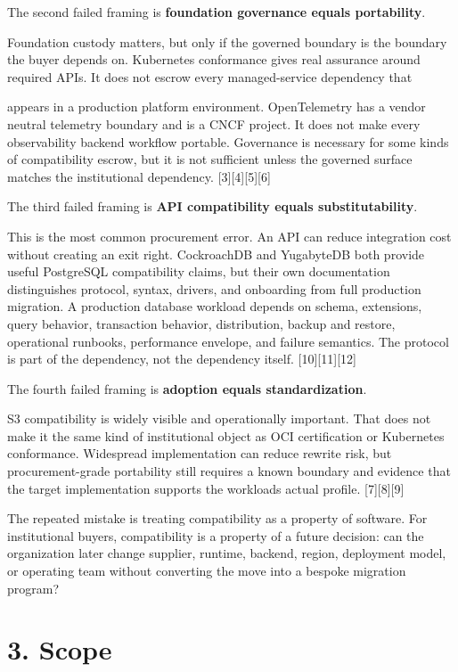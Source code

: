 \documentclass[11pt]{article}
\begin{document}
The second failed framing is \textbf{foundation governance equals portability}.

Foundation custody matters, but only if the governed boundary is the boundary the buyer depends on. Kubernetes conformance gives real assurance around required APIs. It does not escrow every managed-service dependency that

appears in a production platform environment. OpenTelemetry has a vendor neutral telemetry boundary and is a CNCF project. It does not make every observability backend workflow portable. Governance is necessary for some kinds of compatibility escrow, but it is not sufficient unless the governed surface matches the institutional dependency. {[}3{]}{[}4{]}{[}5{]}{[}6{]}

The third failed framing is \textbf{API compatibility equals substitutability}.

This is the most common procurement error. An API can reduce integration cost without creating an exit right. CockroachDB and YugabyteDB both provide useful PostgreSQL compatibility claims, but their own documentation distinguishes protocol, syntax, drivers, and onboarding from full production migration. A production database workload depends on schema, extensions, query behavior, transaction behavior, distribution, backup and restore, operational runbooks, performance envelope, and failure semantics. The protocol is part of the dependency, not the dependency itself. {[}10{]}{[}11{]}{[}12{]}

The fourth failed framing is \textbf{adoption equals standardization}.

S3 compatibility is widely visible and operationally important. That does not make it the same kind of institutional object as OCI certification or Kubernetes conformance. Widespread implementation can reduce rewrite risk, but procurement-grade portability still requires a known boundary and evidence that the target implementation supports the workload\textquotesingle s actual profile. {[}7{]}{[}8{]}{[}9{]}

The repeated mistake is treating compatibility as a property of software. For institutional buyers, compatibility is a property of a future decision: can the organization later change supplier, runtime, backend, region, deployment model, or operating team without converting the move into a bespoke migration program?

\section{3. Scope}\label{scope}
\end{document}
